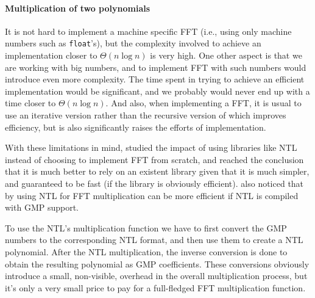 \paragraph*{Multiplication of two polynomials}
It is not hard to implement a machine specific FFT (i.e., using only machine
numbers such as \texttt{float}'s), but the complexity involved to achieve an
implementation closer to $\Theta(n \log{n})$ is very high. One other aspect is
that we are working with big numbers, and to implement FFT with such numbers
would introduce even more complexity.
The time spent in trying to achieve an efficient implementation would be
significant, and we probably would never end up with a time closer to $\Theta(n
\log{n})$. And also, when implementing a FFT, it is usual to use an iterative
version rather than the recursive version of  which improves
efficiency, but is also significantly raises the efforts of implementation.

With these limitations in mind, \textcite{Fateman:2010} studied the impact of
using libraries like NTL instead of choosing to implement FFT from scratch, and
reached the conclusion that it is much better to rely on an existent library
given that it is much simpler, and guaranteed to be fast (if the library is
obviously efficient).
\citeauthor{Fateman:2010} also noticed that by using NTL for FFT multiplication
can be more efficient if NTL is compiled with GMP support\footnotemark.


To use the NTL's multiplication function we have to first convert the GMP
numbers to the corresponding NTL format, and then use them to create a NTL
polynomial. After the NTL multiplication, the inverse conversion is done to
obtain the resulting polynomial as GMP coefficients.  These conversions
obviously introduce a small, non-visible, overhead in the overall
multiplication process, but it's only a very small price to pay for
a full-fledged FFT multiplication function.

